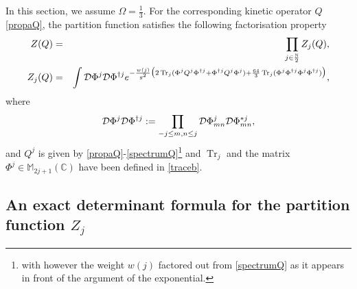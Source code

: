 \documentclass[a4paper,11pt,twoside]{article}
\numberwithin{equation}{section}
\DeclareMathOperator{\tr}{Tr}
\theoremstyle{nonumberplain}
\newcounter{and}
\begin{document}
In this section, we assume $\Omega=\frac{1}{3}$. For the corresponding kinetic operator $Q$ \eqref{propaQ}, the partition function satisfies the following factorisation property%
%
\begin{eqnarray}
Z(Q)&=&\prod_{j\in\frac{\mathbb{N}}{2}}Z_j(Q)\label{zq},\\
Z_j(Q)&=&\int{\cal{D}}\Phi^j{\cal{D}}\Phi^{\dag j}e^{-\frac{w(j)}{g^2}\big(2\tr_j(\Phi^j Q^j\Phi^{\dag j}+\Phi^{\dag j} Q^j\Phi^j)+\frac{64}{3}\tr_j(\Phi^j\Phi^{\dag j}\Phi^j\Phi^{\dag j}) \big)}\label{zqj},
\end{eqnarray}
%
where%
%
\begin{equation}
{\cal{D}}\Phi^j{\cal{D}}\Phi^{\dag j}:=\prod_{-j\le m,n\le j}{\cal{D}}\Phi^j_{mn}{\cal{D}}\Phi^{*j}_{mn},\label{measure}
\end{equation}
%
and $Q^j$ is given by \eqref{propaQ}-\eqref{spectrumQ}{\footnote{with however the weight $w(j)$ factored out from \eqref{spectrumQ} as it appears in front of the argument of the exponential.}} and $\tr_j$ and the matrix $\Phi^j\in\mathbb{M}_{2j+1}(\mathbb{C})$ have been defined in \eqref{traceb}.\par%

\subsection{\texorpdfstring{An exact determinant formula for the partition function $Z_j$}{Exact partition function}}\label{subsection41}
\end{document}
